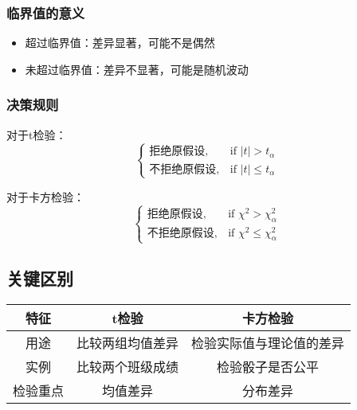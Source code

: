\subsubsection{临界值的意义}
\begin{itemize}
    \item 超过临界值：差异显著，可能不是偶然
    \item 未超过临界值：差异不显著，可能是随机波动
\end{itemize}

\subsubsection{决策规则}
对于t检验：
\[
\begin{cases}
拒绝原假设, & \text{if } |t| > t_\alpha \\
不拒绝原假设, & \text{if } |t| \leq t_\alpha
\end{cases}
\]

对于卡方检验：
\[
\begin{cases}
拒绝原假设, & \text{if } \chi^2 > \chi_\alpha^2 \\
不拒绝原假设, & \text{if } \chi^2 \leq \chi_\alpha^2
\end{cases}
\]

\subsection{关键区别}

\begin{tabular}{|c|c|c|}
\hline
特征 & t检验 & 卡方检验 \\
\hline
用途 & 比较两组均值差异 & 检验实际值与理论值的差异 \\
实例 & 比较两个班级成绩 & 检验骰子是否公平 \\
检验重点 & 均值差异 & 分布差异 \\
\hline
\end{tabular}

